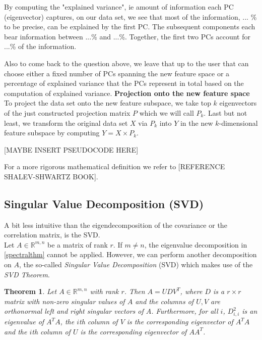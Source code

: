 \documentclass[journal, a4paper]{IEEEtran}
\newtheorem{theorem}{Theorem}[section]
\begin{document}
By computing the "explained variance", ie amount of information each PC (eigenvector) captures, on our data set, we see that most of the information, ... \% to be precise, can be explained by the first PC. The subsequent components each bear information between ...\% and ...\%. Together, the first two PCs account for ...\% of the information.

Also to come back to the question above, we leave that up to the user that can choose either a fixed number of PCs spanning the new feature space or a percentage of explained variance that the PCs represent in total based on the computation of explained variance.
\newline
\textbf{Projection onto the new feature space}
To project the data set onto the new feature subspace, we take top \( k \) eigenvectors of the just constructed projection matrix \( P \) which we will call \( P_{k} \).
Last but not least, we transform the original data set \( X \) via \( P_{k} \) into \( Y \) in the new \(k\)-dimensional feature subspace by computing \( Y = X \times P_{k} \).

[MAYBE INSERT PSEUDOCODE HERE]

For a more rigorous mathematical definition we refer to [REFERENCE SHALEV-SHWARTZ BOOK].



\subsection{Singular Value Decomposition (SVD)}\label{svd}

A bit less intuitive than the eigendecomposition of the covariance or the correlation matrix, is the SVD.\\
Let \( A \in \mathbb{R}^{m,n} \) be a matrix of rank \( r \). If \( m \neq n\), the eigenvalue decomposition in \ref{spectralthm} cannot be applied. However, we can perform another decomposition on \( A \), the so-called \textit{Singular Value Decomposition} (SVD) which makes use of the \textit{SVD Theorem}.
\begin{theorem}\label{svdthm}
	Let \( A \in \mathbb{R}^{m,n} \) with rank \( r \). Then \( A = UDV^T\), where \( D \) is a \( r \times r \) matrix with non-zero singular values of \( A \) and the columns of \( U, V \) are orthonormal left and right singular vectors of \( A \). Furthermore, for all \( i \), \( D_{i,i}^{2} \) is an eigenvalue of \( A^T A\), the \( i \)th column of \( V \) is the corresponding eigenvector of \( A^T A\) and the \( i \)th column of \( U \) is the corresponding eigenvector of \( A A^T\).
\end{theorem}
\end{document}
